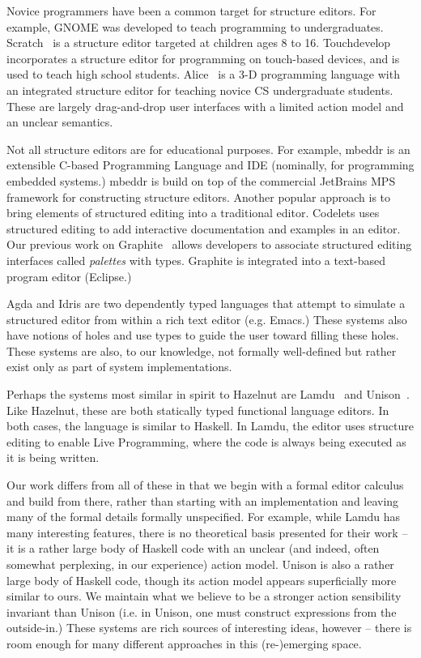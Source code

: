 \documentclass{llncs}
\begin{document}
Novice programmers have been a common target for structure editors. For example,
GNOME\cite{garlan_gnome:_1984} was developed to teach programming to undergraduates.
Scratch~\cite{Resnick:2009:SP:1592761.1592779} is a structure editor targeted at children ages 8 to 16.
Touchdevelop \cite{tillmann_touchdevelop:_2011} incorporates a structure editor for programming on touch-based devices, and is used to teach high school students.
Alice~\cite{Conway:2000:ALL:332040.332481} is a 3-D programming language with an integrated structure editor for teaching novice CS undergraduate students. These are largely drag-and-drop user interfaces with a limited action model and an unclear semantics.

Not all structure editors are for educational purposes. For example,
mbeddr \cite{voelter_mbeddr:_2012} is an extensible C-based Programming Language and IDE (nominally, for programming embedded systems.)
mbeddr is build on top of the commercial JetBrains MPS framework for constructing structure editors.
Another popular approach is to bring elements of structured editing into a traditional editor.
Codelets \cite{oney_codelets:_2012} uses structured editing to add interactive documentation and examples in an editor. 
Our previous work on Graphite~\cite{Omar:2012:ACC:2337223.2337324} allows developers to associate structured editing interfaces called  \emph{palettes} with types. Graphite is integrated into a text-based program editor (Eclipse.) 

Agda and Idris are two dependently typed languages that attempt to simulate a structured editor from within a rich text editor (e.g. Emacs.) These systems also have notions of holes and use types to guide the user toward filling these holes. These  systems are also, to our knowledge, not formally well-defined but rather exist only as part of system implementations.

Perhaps the systems most similar in spirit to Hazelnut are Lamdu~\cite{lamdu} and Unison~\cite{unison}. Like Hazelnut, these are both statically typed functional language editors. In both cases, the language is similar to Haskell. In Lamdu, the editor uses structure editing to enable Live Programming, where the code is always being executed as it is being written. 

Our work differs from all of these in that we begin with a formal editor calculus and build from there, rather than starting with an implementation and leaving many of the formal details formally unspecified. For example, while Lamdu has many interesting features, there is no theoretical basis presented for their work -- it is a rather large body of Haskell code with an unclear (and indeed, often somewhat perplexing, in our experience) action model. Unison is also a rather large body of Haskell code, though its action model appears superficially more similar to ours. We maintain what we believe to be a stronger action sensibility invariant than Unison (i.e. in Unison, one must construct expressions from the outside-in.) These systems are rich sources of interesting ideas, however -- there is room enough for many different approaches in this (re-)emerging space.
\end{document}
